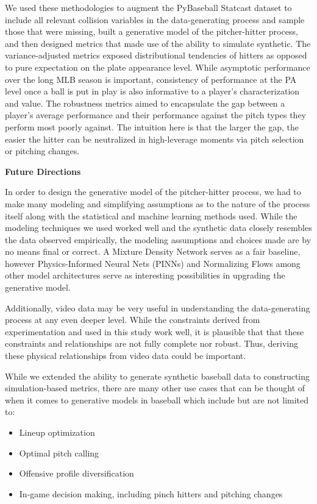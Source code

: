 \documentclass[11pt]{article}
\begin{document}
We used these methodologies to augment the PyBaseball Statcast dataset to include all relevant collision variables in the data-generating process and sample those that were missing, built a generative model of the pitcher-hitter process, and then designed metrics that made use of the ability to simulate synthetic. The variance-adjusted metrics exposed distributional tendencies of hitters as opposed to pure expectation on the plate appearance level. While asymptotic performance over the long MLB season is important, consistency of performance at the PA level once a ball is put in play is also informative to a player's characterization and value. The robustness metrics aimed to encapsulate the gap between a player's average performance and their performance against the pitch types they perform most poorly against. The intuition here is that the larger the gap, the easier the hitter can be neutralized in high-leverage moments via pitch selection or pitching changes. 

\textbf{Future Directions}

In order to design the generative model of the pitcher-hitter process, we had to make many modeling and simplifying assumptions as to the nature of the process itself along with the statistical and machine learning methods used. While the modeling techniques we used worked well and the synthetic data closely resembles the data observed empirically, the modeling assumptions and choices made are by no means final or correct. A Mixture Density Network serves as a fair baseline, however Physics-Informed Neural Nets (PINNs) and Normalizing Flows among other model architectures serve as interesting possibilities in upgrading the generative model. 

Additionally, video data may be very useful in understanding the data-generating process at any even deeper level. While the constraints derived from experimentation and used in this study work well, it is plausible that that these constraints and relationships are not fully complete nor robust. Thus, deriving these physical relationships from video data could be important.

While we extended the ability to generate synthetic baseball data to constructing simulation-based metrics, there are many other use cases that can be thought of when it comes to generative models in baseball which include but are not limited to:

\begin{itemize}
    \item Lineup optimization
    \item Optimal pitch calling
    \item Offensive profile diversification
    \item In-game decision making, including pinch hitters and pitching changes
\end{itemize}
\end{document}
